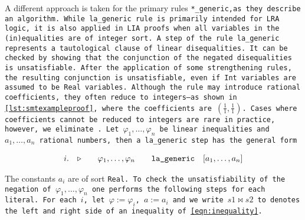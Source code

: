 A different approach is taken for the primary rules \tt{*\_generic},as they describe an algorithm.
While \tt{la\_generic rule} is primarily intended for LRA logic, it is also applied in LIA proofs when all variables in the (in)equalities are of integer sort.
A step of the rule \tt{la\_generic} represents a tautological clause of linear disequalities.  It can be checked by showing that the conjunction of
the negated disequalities is unsatisfiable. After the application of some strengthening rules, the resulting conjunction is unsatisfiable,
even if \lstinline[language=SMT]{Int} variables are assumed to be \lstinline[language=SMT]{Real} variables.
Although the rule may introduce rational coefficients, they often reduce to integers—as shown in \cref{lst:smtexampleproof}, where the coefficients are $(\frac{1}{1}, \frac{1}{1})$.
Cases where coefficients cannot be reduced to integers are rare in practice, however, we eliminate .
Let $\varphi_1,\dots, \varphi_n$ be linear inequalities and $a_1, \dots, a_n$ rational numbers, then a \tt{la\_generic} step has the general form

\[
\begin{matrix*}[c]
  i. & \ctxsep \quad & \varphi_1 , \dots , \varphi_n & \quad \tt{la\_generic}  & [a_1, \dots, a_n] \\
\end{matrix*}
\]

The constants $a_i$ are of sort \tt{Real}. To check the unsatisfiability of the negation of $\varphi_1, \dots, \varphi_n$ one performs the following steps for each literal. For each $i$, let $\varphi := \varphi_i$, $a := a_i$ and
we write $s1 \bowtie s2$ to denotes the left and right side of an inequality of \cref{eqn:inequality}.


